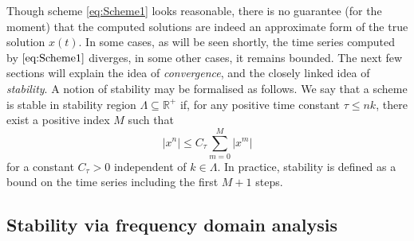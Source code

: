 Though scheme \eqref{eq:Scheme1} looks reasonable, there is no guarantee (for the moment) that the computed solutions are indeed an approximate form of the true solution $x(t)$. In some cases, as will be seen shortly, the time series computed by $\eqref{eq:Scheme1}$ diverges, in some other cases, it remains bounded. The next few sections will explain the idea of \emph{convergence}, and the closely linked idea of \emph{stability}. A notion of stability may be formalised as follows. We say that a scheme is stable in stability region $\Lambda \subseteq \mathbb{R}^+$ if, for any positive time constant $\tau \leq n k$, there exist a positive index $M$ such that
\begin{equation}\label{eq:StabDef}
    |x^n| \leq C_\tau \sum_{m = 0}^M |x^m|
\end{equation}
for a constant $C_\tau > 0$ independent of $k \in \Lambda$. In practice, stability is defined as a bound on the time series including the first $M+1$ steps. 

\subsection{Stability via frequency domain analysis}\label{sec:FreqDomSHO}

